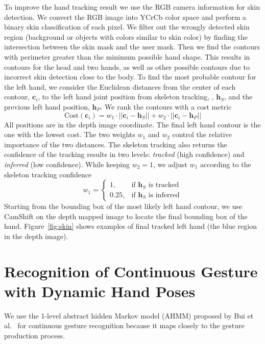 \documentclass{acm_proc_article-sp}
\begin{document}
To improve the hand tracking result we use the RGB camera information for skin
detection. We convert the RGB image into YCrCb color space and perform a
binary skin classification of each pixel. We filter out the wrongly detected skin
region (background or objects with colors similar to skin color) by finding the
intersection between the skin mask and the user mask. Then we find the contours
with perimeter greater than the minimum possible hand shape. This
results in contours for the head and two hands, as well as other possible contours due
to incorrect skin detection close to the body. To find the most probable contour for
the left hand, we consider the Euclidean distances from the center of each
contour, $\mathbf{c}_i$, to the left hand joint position from skeleton
tracking, , $\mathbf{h}_S$, and the previous left hand position, $\mathbf{h}_P$. We rank
the contours with a cost metric
\begin{displaymath}
\text{Cost}(\mathbf{c}_i) = w_1 \cdot ||\mathbf{c}_i - \mathbf{h}_S|| + w_2 \cdot ||\mathbf{c}_i
- \mathbf{h}_P||
\end{displaymath}
All positions are in the depth image coordinate. The final left hand contour is
the one with the lowest cost.
The two weights $w_1$ and $w_2$ control the relative importance of the two distances. The
skeleton tracking also returns the confidence of the tracking results in two
levels: \textit{tracked} (high confidence) and \textit{inferred} (low
confidence). While keeping $w_2 = 1$, we adjust $w_1$ according to the skeleton
tracking confidence
\begin{displaymath}
w_1 = 
\begin{cases}
  1, & \text{if } \mathbf{h}_S \text{ is tracked} \\
  0.25, & \text{if } \mathbf{h}_S \text{ is inferred} 
\end{cases}
\end{displaymath}
Starting from the bounding box of the most likely left hand
contour, we use CamShift \cite{Bradski98} on the depth mapped image
to locate the final bounding box of the hand. Figure~\ref{fig:skin} shows
examples of final tracked left hand (the blue region in the depth image).

\section{Recognition of Continuous Gesture with Dynamic Hand Poses}\label{sec:recognition}
We use the 1-level abstract hidden Markov model (AHMM)
proposed by Bui et al.~\cite{bui00} for continuous gesture recognition because
it maps closely to the gesture production process. 
\end{document}
